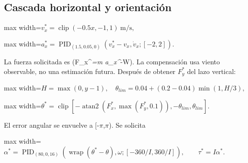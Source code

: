 \documentclass[12pt,a4paper]{article}
\begin{document}
\subsection{Cascada horizontal y orientación}

\begin{center}\begin{adjustbox}{max width=\linewidth}$\displaystyle v_x^*=\operatorname{clip}(-0.5x,-1,1)\ \mathrm{m/s},$\end{adjustbox}\end{center}


\begin{center}\begin{adjustbox}{max width=\linewidth}$\displaystyle a_x^*=\operatorname{PID}_{(1.5,0.05,0)}(v_x^*-v_x,\dot v_x;[-2,2]).$\end{adjustbox}\end{center}



La fuerza solicitada es (F\_x\textasciicircum{}\emph{=m a\_x\textasciicircum{}}-W). La compensación usa viento observable,\allowbreak{} no una estimación futura. Después de obtener $F_y^*$ del lazo vertical:



\begin{center}\begin{adjustbox}{max width=\linewidth}$\displaystyle H=\max(0,y-1),\quad
\theta_{lim}=0.04+(0.2-0.04)\min(1,H/3),$\end{adjustbox}\end{center}


\begin{center}\begin{adjustbox}{max width=\linewidth}$\displaystyle \theta^*=\operatorname{clip}\left[-\operatorname{atan2}(F_x^*,\max(F_y^*,0.1)),
-\theta_{lim},\theta_{lim}\right].$\end{adjustbox}\end{center}



El error angular se envuelve a [-\ensuremath{\pi},\allowbreak{}\ensuremath{\pi}). Se solicita



\begin{center}\begin{adjustbox}{max width=\linewidth}$\displaystyle \alpha^*=\operatorname{PID}_{(80,0,16)}(\operatorname{wrap}(\theta^*-\theta),\omega;
[-360/I,360/I]),\qquad \tau^*=I\alpha^*.$\end{adjustbox}\end{center}
\end{document}
